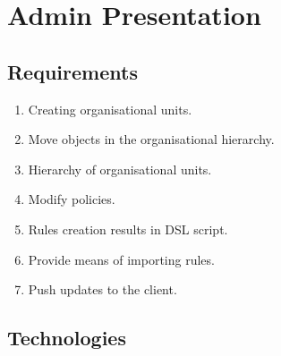 \section{Admin Presentation} 

	\subsection{Requirements}
	
		\begin{enumerate}[itemsep=1pt,parsep=1pt]
			\item Creating organisational units.
			\item Move objects in the organisational hierarchy.
			\item Hierarchy of organisational units.
			\item Modify policies.
			\item Rules creation results in DSL script.
			\item Provide means of importing rules.
			\item Push updates to the client.
		\end{enumerate}
		
	\subsection{Technologies}
			
